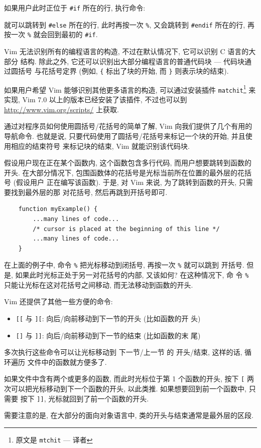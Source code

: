 如果用户此时正位于 \texttt{\#if} 所在的行, 执行命令:
\begin{vimcode}
%
\end{vimcode}
就可以跳转到 \texttt{\#else} 所在的行, 此时再按一次 \verb'%', 又会跳转到
\texttt{\#endif} 所在的行, 再按一次 \verb'%' 就会回到最初的 \texttt{\#if}.

Vim 无法识别所有的编程语言的构造, 不过在默认情况下, 它可以识别 C 语言的大部分
结构. 除此之外, 它还可以识别出大部分编程语言的普通代码块 --- 代码块通过圆括号
与花括号定界 (例如, \verb'{' 标出了块的开始, 而 \verb'}' 则表示块的结束).
\begin{warning}
    如果用户希望 Vim 能够识别其他更多语言的构造, 可以通过安装插件
    \texttt{matchit}\footnote{原文是 \texttt{mtchit} --- 译者} 来实现, Vim 7.0
    以上的版本已经安装了该插件, 不过也可以到 \url{http://www.vim.org/scripts/}
    上获取.
\end{warning}

通过对程序员如何使用圆括号/花括号的简单了解, Vim 向我们提供了几个有用的导航命令.
也就是说, 只要代码使用了圆括号/花括号来标记一个块的开始, 并且使用相应的结束符号
来标记块的结束, Vim 就能识别该代码块.

假设用户现在正在某个函数内, 这个函数包含多行代码, 而用户想要跳转到函数的开头.
在大部分情况下, 包围函数体的花括号是光标当前所在位置的最外层的花括号 (假设用户
正在编写该函数). 于是, 对 Vim 来说, 为了跳转到函数的开头, 只需要找到最外层的那
对花括号, 然后再跳到开括号即可.
\begin{verbatim}
    function myExample() {
        ...many lines of code...
        /* cursor is placed at the beginning of this line */
        ...many lines of code...
    }
\end{verbatim}
在上面的例子中, 命令 \verb'%' 把光标移动到闭括号, 再按一次 \verb'%' 就可以跳到
开括号. 但是, 如果此时光标正处于另一对花括号的内部, 又该如何? 在这种情况下, 命
令 \verb'%' 只能让光标在这对花括号之间移动, 而无法移动到函数的开头.

Vim 还提供了其他一些方便的命令:
\begin{itemize}
    \item \texttt{[[} 与  \texttt{][}: 向后/向前移动到下一节的开头 (比如函数的开
        头)
    \item \texttt{[]} 与  \texttt{]]}: 向后/向前移动到下一节的结束 (比如函数的末
        尾)
\end{itemize}
多次执行这些命令可以让光标移动到 下一节/上一节 的 开头/结束, 这样的话, 循环遍历
文件中的函数就方便多了.

如果文件中含有两个或更多的函数, 而此时光标位于第 1 个函数的开头, 按下 \texttt{[}
两次可以把光标移动到下一个函数的开头, 以此类推. 如果想要回到前一个函数中, 只需要
按下 \texttt{]]}, 光标就回到了前一个函数的开头.
\begin{warning}
    需要注意的是, 在大部分的面向对象语言中, 类的开头与结束通常是最外层的区段.
\end{warning}

